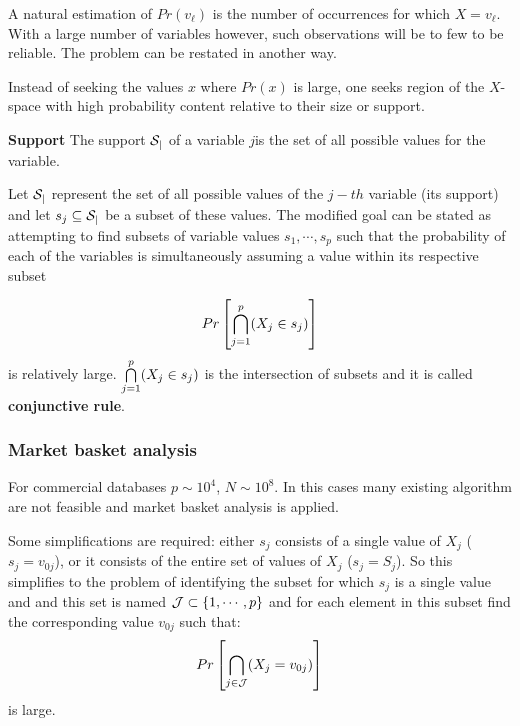A natural estimation of $Pr(v_\ell)$ is the number of occurrences for which $X=v_\ell$. With a large number of variables however, such observations will be to few to be reliable. The problem can be restated in another way.

Instead of seeking the values $x$ where $Pr(x)$ is large, one seeks region of the $X$-space with high probability content relative to their size or support.
\begin{definition}{\textbf{Support}}
The support $\CMcal{S_j}$ of a variable $j$is the set of all possible values for the variable.
\end{definition}
Let $\CMcal{S_j}$ represent the set of all possible values of the $j-th$ variable (its support) and let $ s_j \subseteq \CMcal{S_j}$ be a subset of these values. The modified goal can be stated as attempting to find subsets of variable values $s_1, \cdots, s_p$ such that the probability of each of the  variables is simultaneously assuming a value within its respective subset

\begin{equation}
Pr\left[ \bigcap\limits_{j = 1}^p \br{X_j \in s_j}\right]
\end{equation}
 is relatively large. $\bigcap\limits_{j = 1}^p \br{X_j \in s_j}$ is the intersection of subsets and it is called \textbf{conjunctive rule}.

\subsubsection{Market basket analysis}
For commercial databases $p\sim 10^4$, $N \sim 10^8$. In this cases many existing algorithm are not feasible and market basket analysis is applied.

Some simplifications are required: either $s_j$ consists of a single value of $X_j$ ($s_j = v_{0j}$), or it consists of the entire set of values of $X_j$ ($s_j = S_j$). So this simplifies to the problem of identifying the subset for which $s_j$ is a single value and and this  set is named $\CMcal{J} \subset \{1,\cdots,p\}$ and for each element in this subset find the corresponding value $v_{0j}$ such that:
\begin{equation}
Pr\left[ \bigcap\limits_{j \in \CMcal{J}} \br{X_j = v_{0j}}\right]
\label{dummyVarProb}
\end{equation}
is large.

